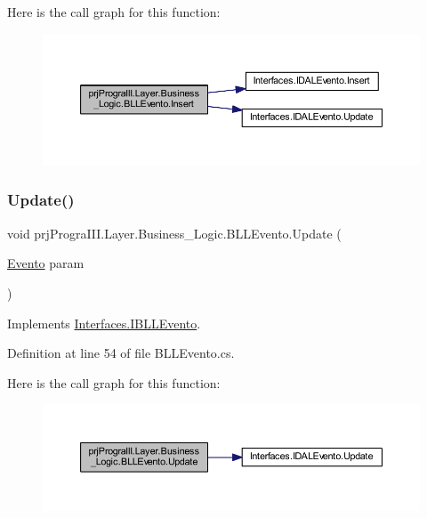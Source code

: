 Here is the call graph for this function\+:
\nopagebreak
\begin{figure}[H]
\begin{center}
\leavevmode
\includegraphics[width=350pt]{classprj_progra_i_i_i_1_1_layer_1_1_business___logic_1_1_b_l_l_evento_a9e31720e59b580db4bff3b1ab7d3e284_cgraph}
\end{center}
\end{figure}
\hypertarget{classprj_progra_i_i_i_1_1_layer_1_1_business___logic_1_1_b_l_l_evento_ad9bbb373b1a005e7ef584586ad20f387}{}\label{classprj_progra_i_i_i_1_1_layer_1_1_business___logic_1_1_b_l_l_evento_ad9bbb373b1a005e7ef584586ad20f387} 
\subsubsection{\texorpdfstring{Update()}{Update()}}
{\footnotesize\ttfamily void prj\+Progra\+I\+I\+I.\+Layer.\+Business\+\_\+\+Logic.\+B\+L\+L\+Evento.\+Update (\begin{DoxyParamCaption}\item[{\hyperlink{classprj_progra_i_i_i_1_1_layer_1_1_entities_1_1_evento}{Evento}}]{param }\end{DoxyParamCaption})}



Implements \hyperlink{interface_interfaces_1_1_i_b_l_l_evento_a905ad055ff01af7bace9440339d07514}{Interfaces.\+I\+B\+L\+L\+Evento}.



Definition at line 54 of file B\+L\+L\+Evento.\+cs.

Here is the call graph for this function\+:
\nopagebreak
\begin{figure}[H]
\begin{center}
\leavevmode
\includegraphics[width=350pt]{classprj_progra_i_i_i_1_1_layer_1_1_business___logic_1_1_b_l_l_evento_ad9bbb373b1a005e7ef584586ad20f387_cgraph}
\end{center}
\end{figure}


